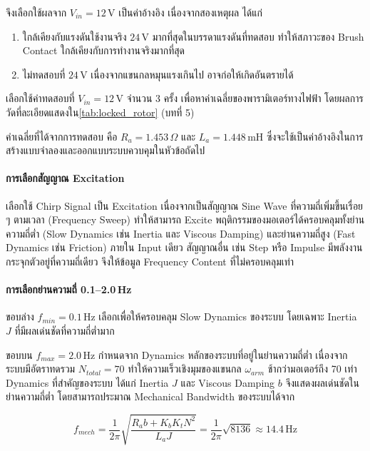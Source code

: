 จึงเลือกใช้ผลจาก $V_{in} = 12$\,V เป็นค่าอ้างอิง เนื่องจากสองเหตุผล ได้แก่
\begin{enumerate}
  \item ใกล้เคียงกับแรงดันใช้งานจริง $24$\,V มากที่สุดในบรรดาแรงดันที่ทดสอบ
        ทำให้สภาวะของ Brush Contact ใกล้เคียงกับการทำงานจริงมากที่สุด
  \item ไม่ทดสอบที่ $24$\,V เนื่องจากแขนกลหมุนแรงเกินไป อาจก่อให้เกิดอันตรายได้
\end{enumerate}

เลือกใช้ค่าทดสอบที่ $V_{in} = 12$\,V จำนวน 3 ครั้ง เพื่อหาค่าเฉลี่ยของพารามิเตอร์ทางไฟฟ้า โดยผลการวัดที่ละเอียดแสดงใน\cref{tab:locked_rotor} (บทที่ 5)

ค่าเฉลี่ยที่ได้จากการทดสอบ คือ $R_a = 1.453\,\Omega$ และ $L_a = 1.448\,\text{mH}$
ซึ่งจะใช้เป็นค่าอ้างอิงในการสร้างแบบจำลองและออกแบบระบบควบคุมในหัวข้อถัดไป

\paragraph{การเลือกสัญญาณ Excitation}

เลือกใช้ Chirp Signal เป็น Excitation เนื่องจากเป็นสัญญาณ Sine Wave 
ที่ความถี่เพิ่มขึ้นเรื่อย ๆ ตามเวลา (Frequency Sweep) 
ทำให้สามารถ Excite พฤติกรรมของมอเตอร์ได้ครอบคลุมทั้งย่านความถี่ต่ำ 
(Slow Dynamics เช่น Inertia และ Viscous Damping) 
และย่านความถี่สูง (Fast Dynamics เช่น Friction) ภายใน Input เดียว
สัญญาณอื่น เช่น Step หรือ Impulse มีพลังงานกระจุกตัวอยู่ที่ความถี่เดียว
จึงให้ข้อมูล Frequency Content ที่ไม่ครอบคลุมเท่า

\paragraph{การเลือกย่านความถี่ 0.1--2.0\,Hz}

ขอบล่าง $f_{min} = 0.1$\,Hz เลือกเพื่อให้ครอบคลุม Slow Dynamics
ของระบบ โดยเฉพาะ Inertia $J$ ที่มีผลเด่นชัดที่ความถี่ต่ำมาก

ขอบบน $f_{max} = 2.0$\,Hz กำหนดจาก Dynamics หลักของระบบที่อยู่ในย่านความถี่ต่ำ
เนื่องจากระบบมีอัตราทดรวม $N_{total} = 70$ ทำให้ความเร็วเชิงมุมของแขนกล $\omega_{arm}$
ช้ากว่ามอเตอร์ถึง 70 เท่า Dynamics ที่สำคัญของระบบ ได้แก่ Inertia $J$ และ
Viscous Damping $b$ จึงแสดงผลเด่นชัดในย่านความถี่ต่ำ โดยสามารถประมาณ
Mechanical Bandwidth ของระบบได้จาก

\begin{equation}
    f_{mech} = \frac{1}{2\pi}\sqrt{\frac{R_a b + K_b K_t N^2}{L_a J}}
             = \frac{1}{2\pi}\sqrt{8136}
             \approx 14.4\,\text{Hz}
    \label{eq:f_mech}
\end{equation}

